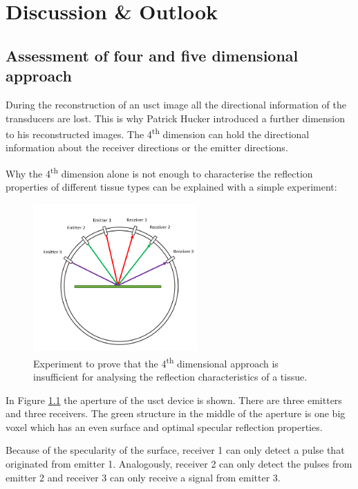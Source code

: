 \chapter{Discussion \& Outlook}
\label{chap:discussion}


\section{Assessment of four and five dimensional approach}

During the reconstruction of an \ac{usct} image all the directional information of the transducers are lost. This is why Patrick Hucker \cite{PatrickHucker2014EvaluationRuckstreumodells} introduced a further dimension to his reconstructed images. The 4\textsuperscript{th} dimension can hold the directional information about the receiver directions or the emitter directions.

Why the 4\textsuperscript{th} dimension alone is not enough to characterise the reflection properties of different tissue types can be explained with a simple experiment:


\begin{figure}[H]
    \centering
    \includegraphics[width=0.56\textwidth]{Graphics/Diskussion/4D_not_enough.png}
    \caption{Experiment to prove that the 4\textsuperscript{th} dimensional approach is insufficient for analysing the reflection characteristics of a tissue. }
    \label{4D_sucks}
\end{figure}

In Figure \ref{4D_sucks} the aperture of the \ac{usct} device is shown. There are three emitters and three receivers. The green structure in the middle of the aperture is one big voxel which has an even surface and optimal specular reflection properties.

Because of the specularity of the surface, receiver 1 can only detect a pulse that originated from emitter 1. Analogously, receiver 2 can only detect the pulses from emitter 2 and receiver 3 can only receive a signal from emitter 3.

